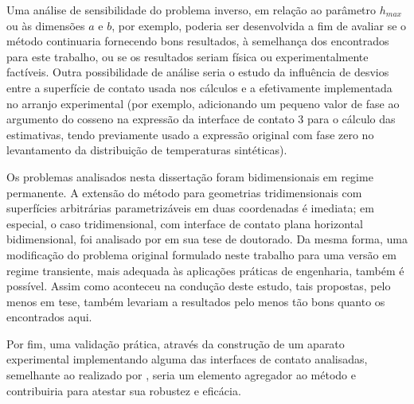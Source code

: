 Uma análise de sensibilidade do problema inverso, em relação ao parâmetro $h_{max}$ ou às dimensões $a$ e $b$, por exemplo, poderia ser desenvolvida a fim de avaliar se o método continuaria fornecendo bons resultados, à semelhança dos encontrados para este trabalho, ou se os resultados seriam física ou experimentalmente factíveis. Outra possibilidade de análise seria o estudo da influência de desvios entre a superfície de contato usada nos cálculos e a efetivamente implementada no arranjo experimental (por exemplo, adicionando um pequeno valor de fase ao argumento do cosseno na expressão da interface de contato 3 para o cálculo das estimativas, tendo previamente usado a expressão original com fase zero no levantamento da distribuição de temperaturas sintéticas).

Os problemas analisados nesta dissertação foram bidimensionais em regime permanente. A extensão do método para geometrias tridimensionais com superfícies arbitrárias parametrizáveis em duas coordenadas é imediata; em especial, o caso tridimensional, com interface de contato plana horizontal bidimensional, foi analisado por \cite{tese_camila} em sua tese de doutorado. Da mesma forma, uma modificação do problema original formulado neste trabalho para uma versão em regime transiente, mais adequada às aplicações práticas de engenharia, também é possível. Assim como aconteceu na condução deste estudo, tais propostas, pelo menos em tese, também levariam a resultados pelo menos tão bons quanto os encontrados aqui.

Por fim, uma validação prática, através da construção de um aparato experimental implementando alguma das interfaces de contato analisadas, semelhante ao realizado por \cite{tese_abreu}, seria um elemento agregador ao método e contribuiria para atestar sua robustez e eficácia.